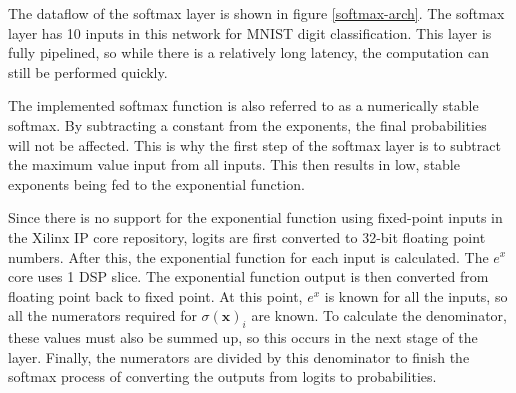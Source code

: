 The dataflow of the softmax layer is shown in figure \ref{softmax-arch}. The softmax layer has 10 inputs in this network for MNIST digit classification. This layer is fully pipelined, so while there is a relatively long latency, the computation can still be performed quickly. 

The implemented softmax function is also referred to as a numerically stable softmax. By subtracting a constant from the exponents, the final probabilities will not be affected. This is why the first step of the softmax layer is to subtract the maximum value input from all inputs. This then results in low, stable exponents being fed to the exponential function. 

Since there is no support for the exponential function using fixed-point inputs in the Xilinx IP core repository, logits are first converted to 32-bit floating point numbers. After this, the exponential function for each input is calculated. The $e^x$ core uses 1 DSP slice. The exponential function output is then converted from floating point back to fixed point. At this point, $e^x$ is known for all the inputs, so all the numerators required for $\sigma(\mathbf{x})_i$ are known. To calculate the denominator, these values must also be summed up, so this occurs in the next stage of the layer. Finally, the numerators are divided by this denominator to finish the softmax process of converting the outputs from logits to probabilities.
